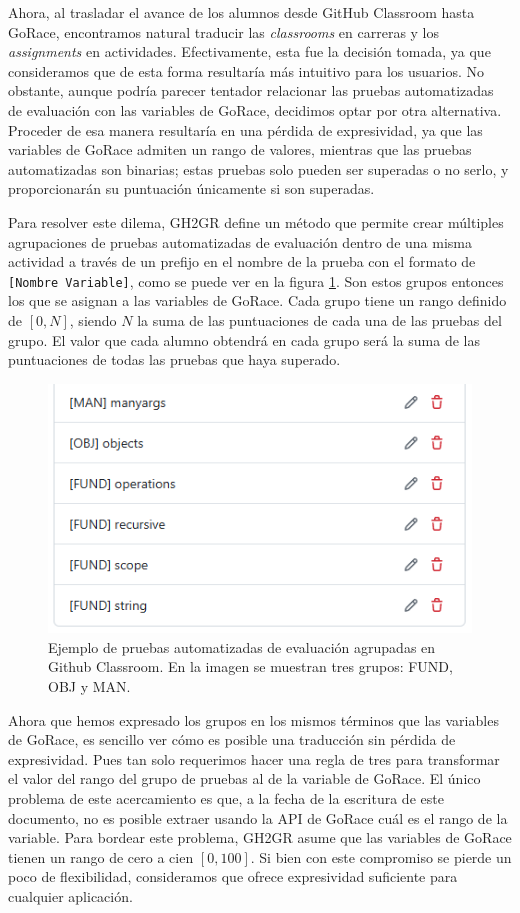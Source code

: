 Ahora, al trasladar el avance de los alumnos desde GitHub Classroom hasta GoRace, encontramos natural traducir las \textit{classrooms} en carreras y los \textit{assignments} en actividades. Efectivamente, esta fue la decisión tomada, ya que consideramos que de esta forma resultaría más intuitivo para los usuarios. No obstante, aunque podría parecer tentador relacionar las pruebas automatizadas de evaluación con las variables de GoRace, decidimos optar por otra alternativa. Proceder de esa manera resultaría en una pérdida de expresividad, ya que las variables de GoRace admiten un rango de valores, mientras que las pruebas automatizadas son binarias; estas pruebas solo pueden ser superadas o no serlo, y proporcionarán su puntuación únicamente si son superadas.

Para resolver este dilema, GH2GR define un método que permite crear múltiples agrupaciones de pruebas automatizadas de evaluación dentro de una misma actividad a través de un prefijo en el nombre de la prueba con el formato de \texttt{[Nombre Variable]}, como se puede ver en la figura \ref{fig:variable-groups-autograding-tests}. Son estos grupos entonces los que se asignan a las variables de GoRace. Cada grupo tiene un rango definido de \([0,N]\), siendo \(N\) la suma de las puntuaciones de cada una de las pruebas del grupo. El valor que cada alumno obtendrá en cada grupo será la suma de las puntuaciones de todas las pruebas que haya superado.

\begin{figure}
    \centering
    \includegraphics[width=0.5\linewidth]{images/variable-groups-autograding-tests.png}
    \caption{Ejemplo de pruebas automatizadas de evaluación agrupadas en Github Classroom. En la imagen se muestran tres grupos: FUND, OBJ y MAN.}
    \label{fig:variable-groups-autograding-tests}
\end{figure}

Ahora que hemos expresado los grupos en los mismos términos que las variables de GoRace, es sencillo ver cómo es posible una traducción sin pérdida de expresividad. Pues tan solo requerimos hacer una regla de tres para transformar el valor del rango del grupo de pruebas al de la variable de GoRace. El único problema de este acercamiento es que, a la fecha de la escritura de este documento, no es posible extraer usando la API de GoRace cuál es el rango de la variable. Para bordear este problema, GH2GR asume que las variables de GoRace tienen un rango de cero a cien \([0,100]\). Si bien con este compromiso se pierde un poco de flexibilidad, consideramos que ofrece expresividad suficiente para cualquier aplicación.


